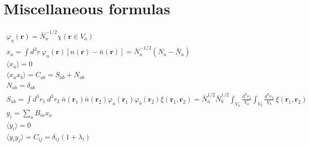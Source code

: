 \documentclass{article}
\renewcommand{\vec}[1]{\bm{#1}}
\renewcommand{\phi}{\varphi}
\newcommand{\nbar}{\bar{n}}
\newcommand{\Nbar}{\bar{N}}
\begin{document}
\section*{Miscellaneous formulas}

\begin{gather}
    \phi_a(\vec{r}) = \Nbar_a^{-1/2} \chi(\vec{r} \in V_a) \\
    x_a = \int d^3r~ \phi_a(\vec{r}) [n(\vec{r}) - \nbar(\vec{r})] = \Nbar_a^{-1/2} (N_a - \Nbar_a) \\
    \langle x_a \rangle = 0 \\
    \langle x_a x_b \rangle = C_{ab} = S_{ab} + N_{ab} \\
    N_{ab} = \delta_{ab} \\
    S_{ab} = \int d^3r_1~ d^3r_2~ \nbar(\vec{r}_1) \nbar(\vec{r}_2) \phi_a(\vec{r}_1) \phi_b(\vec{r}_2) \xi(\vec{r}_1,\vec{r}_2)
           = \Nbar_a^{1/2} \Nbar_b^{1/2} \int_{V_a} \frac{d^3r_1}{V_a} \int_{V_b} \frac{d^3r_2}{V_b}~ \xi(\vec{r}_1,\vec{r}_2) \\
    y_i = \sum_a B_{ia} x_a \\
    \langle y_i \rangle = 0 \\
    \langle y_i y_j \rangle = C_{ij} = \delta_{ij}(1 + \lambda_i) \\
\end{gather}
\end{document}
